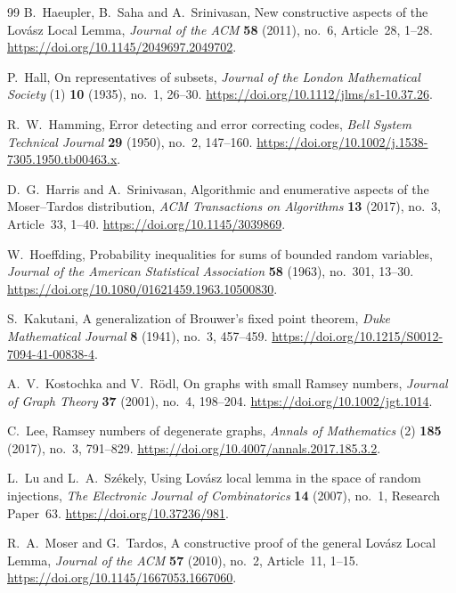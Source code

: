 \begin{thebibliography}{99}
B.~Haeupler, B.~Saha and A.~Srinivasan,
New constructive aspects of the Lov\'asz Local Lemma,
\emph{Journal of the ACM} \textbf{58} (2011), no.~6,
Article~28, 1--28.
\url{https://doi.org/10.1145/2049697.2049702}.

P.~Hall,
On representatives of subsets,
\emph{Journal of the London Mathematical Society}
(1) \textbf{10} (1935), no.~1, 26--30.
\url{https://doi.org/10.1112/jlms/s1-10.37.26}.

R.~W.~Hamming,
Error detecting and error correcting codes,
\emph{Bell System Technical Journal} \textbf{29} (1950), no.~2, 147--160.
\url{https://doi.org/10.1002/j.1538-7305.1950.tb00463.x}.

D.~G.~Harris and A.~Srinivasan,
Algorithmic and enumerative aspects of the Moser--Tardos distribution,
\emph{ACM Transactions on Algorithms} \textbf{13} (2017), no.~3,
Article~33, 1--40.
\url{https://doi.org/10.1145/3039869}.

W.~Hoeffding,
Probability inequalities for sums of bounded random variables,
\emph{Journal of the American Statistical Association}
\textbf{58} (1963), no.~301, 13--30.
\url{https://doi.org/10.1080/01621459.1963.10500830}.

S.~Kakutani,
A generalization of Brouwer's fixed point theorem,
\emph{Duke Mathematical Journal} \textbf{8} (1941), no.~3, 457--459.
\url{https://doi.org/10.1215/S0012-7094-41-00838-4}.

A.~V.~Kostochka and V.~R\"odl,
On graphs with small Ramsey numbers,
\emph{Journal of Graph Theory} \textbf{37} (2001), no.~4, 198--204.
\url{https://doi.org/10.1002/jgt.1014}.

C.~Lee,
Ramsey numbers of degenerate graphs,
\emph{Annals of Mathematics} (2) \textbf{185} (2017), no.~3, 791--829.
\url{https://doi.org/10.4007/annals.2017.185.3.2}.

L.~Lu and L.~A.~Sz\'ekely,
Using Lov\'asz local lemma in the space of random injections,
\emph{The Electronic Journal of Combinatorics}
\textbf{14} (2007), no.~1, Research Paper~63.
\url{https://doi.org/10.37236/981}.

R.~A.~Moser and G.~Tardos,
A constructive proof of the general Lov\'asz Local Lemma,
\emph{Journal of the ACM} \textbf{57} (2010), no.~2,
Article~11, 1--15.
\url{https://doi.org/10.1145/1667053.1667060}.


\end{thebibliography}
